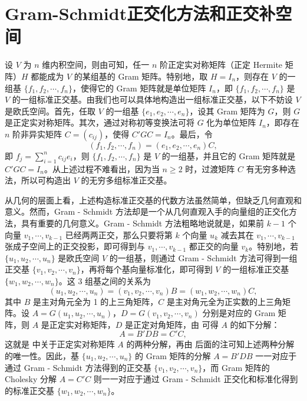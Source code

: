\documentclass[../../main.tex]{subfiles}
\begin{document}
\section{Gram-Schmidt正交化方法和正交补空间}

设 $V$ 为 $n$ 维内积空间，则由可知，任一 $n$ 阶正定实对称矩阵（正定 Hermite 矩阵）$H$ 都能成为 $V$ 的某组基的 Gram 矩阵。特别地，取 $H = I_n$，则存在 $V$ 的一组基 $\{f_1,f_2,\cdots,f_n\}$，使得它的 Gram 矩阵就是单位矩阵 $I_n$，即 $\{f_1,f_2,\cdots,f_n\}$ 是 $V$ 的一组标准正交基。由我们也可以具体地构造出一组标准正交基，以下不妨设 $V$ 是欧氏空间。首先，任取 $V$ 的一组基 $\{e_1,e_2,\cdots,e_n\}$，设其 Gram 矩阵为 $G$，则 $G$ 是正定实对称矩阵。其次，通过对称初等变换法可将 $G$ 化为单位矩阵 $I_n$，即存在 $n$ 阶非异实矩阵 $C = (c_{ij})$，使得 $C'GC = I_n$。最后，令
\[
(f_1,f_2,\cdots,f_n)=(e_1,e_2,\cdots,e_n)C,
\]
即 $f_j = \sum_{i = 1}^{n}c_{ij}e_i$，则 $\{f_1,f_2,\cdots,f_n\}$ 是 $V$ 的一组基，并且它的 Gram 矩阵就是 $C'GC = I_n$。从上述过程不难看出，因为当 $n\geqslant 2$ 时，过渡矩阵 $C$ 有无穷多种选法，所以可构造出 $V$ 的无穷多组标准正交基。

从几何的层面上看，上述构造标准正交基的代数方法虽然简单，但缺乏几何直观和意义。然而，Gram - Schmidt 方法却是一个从几何直观入手的向量组的正交化方法，具有重要的几何意义。Gram - Schmidt 方法粗略地说就是，如果前 $k - 1$ 个向量 $v_1,\cdots,v_{k - 1}$ 已经两两正交，那么只要将第 $k$ 个向量 $u_k$ 减去其在 $v_1,\cdots,v_{k - 1}$ 张成子空间上的正交投影，即可得到与 $v_1,\cdots,v_{k - 1}$ 都正交的向量 $v_k$。特别地，若 $\{u_1,u_2,\cdots,u_n\}$ 是欧氏空间 $V$ 的一组基，则通过 Gram - Schmidt 方法可得到一组正交基 $\{v_1,v_2,\cdots,v_n\}$，再将每个基向量标准化，即可得到 $V$ 的一组标准正交基 $\{w_1,w_2,\cdots,w_n\}$。这 3 组基之间的关系为
\[
(u_1,u_2,\cdots,u_n)=(v_1,v_2,\cdots,v_n)B=(w_1,w_2,\cdots,w_n)C,
\]
其中 $B$ 是主对角元全为 1 的上三角矩阵，$C$ 是主对角元全为正实数的上三角矩阵。设 $A = G(u_1,u_2,\cdots,u_n)$，$D = G(v_1,v_2,\cdots,v_n)$ 分别是对应的 Gram 矩阵，则 $A$ 是正定实对称矩阵，$D$ 是正定对角矩阵，由 可得 $A$ 的如下分解：
\[
A = B'DB = C'C,
\]
这就是 中关于正定实对称矩阵 $A$ 的两种分解，再由 后面的注可知上述两种分解的唯一性。因此，基 $\{u_1,u_2,\cdots,u_n\}$ 的 Gram 矩阵的分解 $A = B'DB$ 一一对应于通过 Gram - Schmidt 方法得到的正交基 $\{v_1,v_2,\cdots,v_n\}$，而 Gram 矩阵的 Cholesky 分解 $A = C'C$ 则一一对应于通过 Gram - Schmidt 正交化和标准化得到的标准正交基 $\{w_1,w_2,\cdots,w_n\}$。
\end{document}
